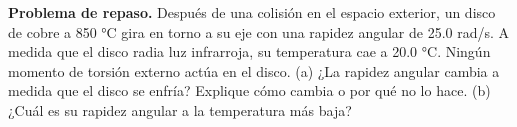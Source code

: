 \item \textbf{Problema de repaso.} Después de una colisión en el espacio exterior, un disco de cobre a 850 °C gira en torno a su eje con una rapidez angular de 25.0 rad/s. A medida que el disco radia luz infrarroja, su temperatura cae a 20.0 °C. Ningún momento de torsión externo actúa en el disco. (a) ¿La rapidez angular cambia a medida que el disco se enfría? Explique cómo cambia o por qué no lo hace. (b) ¿Cuál es su rapidez angular a la temperatura más baja?
